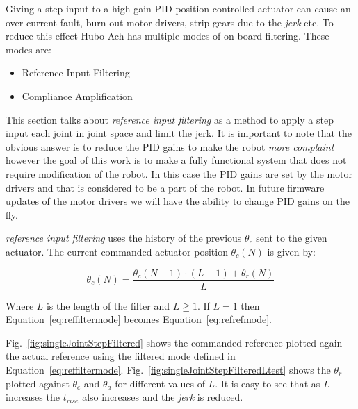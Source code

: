 Giving a step input to a high-gain PID position controlled actuator can cause an over current fault, burn out motor drivers, strip gears due to the \textit{jerk} etc.  
To reduce this effect Hubo-Ach has multiple modes of on-board filtering.
These modes are:
\begin{itemize}
\item Reference Input Filtering
\item Compliance Amplification 
\end{itemize}

This section talks about \textit{reference input filtering} as a method to apply a step input each joint in joint space and limit the jerk.
It is important to note that the obvious answer is to reduce the PID gains to make the robot \textit{more complaint} however the goal of this work is to make a fully functional system that does not require modification of the robot.
In this case the PID gains are set by the motor drivers and that is considered to be a part of the robot.
In future firmware updates of the motor drivers we will have the ability to change PID gains on the fly.

\textit{reference input filtering} uses the history of the previous $\theta_c$ sent to the given actuator.  The current commanded actuator position $\theta_c(N)$ is given by:

\begin{equation}\label{eq:reffiltermode}
\theta_c(N) = \frac{\theta_c(N-1)\cdot\left(L-1\right) + \theta_r(N)}{L}
\end{equation}

Where $L$ is the length of the filter and $L\geqq1$.  
If $L=1$ then Equation~\ref{eq:reffiltermode} becomes Equation~\ref{eq:refrefmode}.



Fig.~\ref{fig:singleJointStepFiltered} shows the commanded reference plotted again the actual reference using the filtered mode defined in Equation~\ref{eq:reffiltermode}.
Fig.~\ref{fig:singleJointStepFilteredLtest} shows the $\theta_r$ plotted against $\theta_c$ and $\theta_a$ for different values of $L$.
It is easy to see that as $L$ increases the $t_{rise}$ also increases and the \textit{jerk} is reduced.


